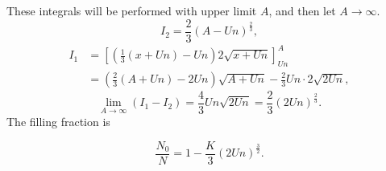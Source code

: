 These integrals will be performed with upper limit $A$, and then let $A\rightarrow\infty$.
\begin{equation}
		I_2 = \frac{2}{3}\left (A-Un\right )^{\frac{2}{3}},
\end{equation}
\begin{equation}
	\begin{aligned}
			I_1 &= \left [\left (\frac{1}{3}\left (x+Un\right )- Un\right )2\sqrt{x+Un}\right ]_{Un}^{A}  \\
		&= \left (\frac{2}{3}\left (A+Un\right )- 2Un\right )\sqrt{A+Un}- \frac{2}{3}Un\cdot 2\sqrt{2Un},
	\end{aligned}
\end{equation}
\begin{equation}
	\lim\limits_{A\rightarrow\infty} (I_1-I_2) = \frac{4}{3}Un\sqrt{2Un}
	= \frac{2}{3}\left (2Un\right )^{\frac{2}{3}}.
\end{equation}
The filling fraction is
\begin{tcolorbox}
\begin{equation}
	\frac{N_0}{N} = 1- \frac{K}{3}\left (2Un\right )^{\frac{3}{2}}.
\end{equation}
\end{tcolorbox}


